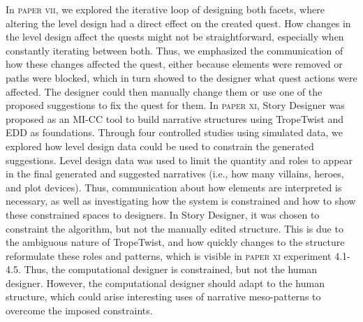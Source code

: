 In \textsc{paper vii}, we explored the iterative loop of designing both facets, where altering the level design had a direct effect on the created quest. How changes in the level design affect the quests might not be straightforward, especially when constantly iterating between both. Thus, we emphasized the communication of how these changes affected the quest, either because elements were removed or paths were blocked, which in turn showed to the designer what quest actions were affected. The designer could then manually change them or use one of the proposed suggestions to fix the quest for them. In \textsc{paper xi}, Story Designer was proposed as an MI-CC tool to build narrative structures using TropeTwist and EDD as foundations. Through four controlled studies using simulated data, we explored how level design data could be used to constrain the generated suggestions. Level design data was used to limit the quantity and roles to appear in the final generated and suggested narratives (i.e., how many villains, heroes, and plot devices). Thus, communication about how elements are interpreted is necessary, as well as investigating how the system is constrained and how to show these constrained spaces to designers. In Story Designer, it was chosen to constraint the algorithm, but not the manually edited structure. This is due to the ambiguous nature of TropeTwist, and how quickly changes to the structure reformulate these roles and patterns, which is visible in \textsc{paper xi} experiment 4.1-4.5. Thus, the computational designer is constrained, but not the human designer. However, the computational designer should adapt to the human structure, which could arise interesting uses of narrative meso-patterns to overcome the imposed constraints.










